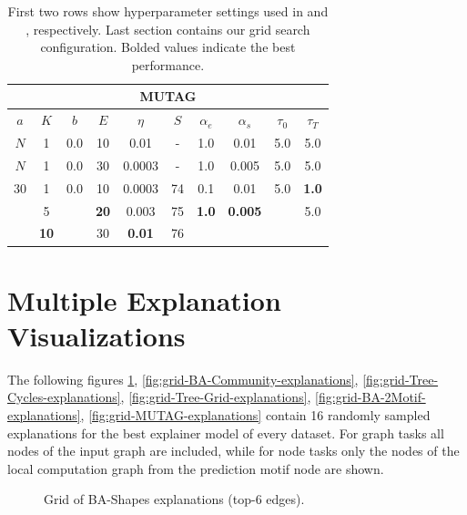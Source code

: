 \begin{table}[h]
  \centering
  \small
  \begin{tabular}{|c|c|c|c|c|c|c|c|c|c|}
  \hline
  \multicolumn{10}{|c|}{\textbf{MUTAG}} \\ \hline
  $a$ & $K$ & $b$ & $E$ & $\eta$ & $S$ & $\alpha_e$ & $\alpha_s$ & $\tau_0$ & $\tau_T$ \\ \hline
  $N$ & 1 & 0.0 & 10 & 0.01 & - & 1.0 & 0.01 & 5.0 & 5.0 \\ \hline
  $N$ & 1 & 0.0 & 30 & 0.0003 & - & 1.0 & 0.005 & 5.0 & 5.0 \\ \hline
  30 & 1 & 0.0 & 10 & 0.0003 & 74 & 0.1 & 0.01 & 5.0 & \textbf{1.0} \\
   & 5 &  & \textbf{20} & 0.003 & 75 & \textbf{1.0} & \textbf{0.005} &  & 5.0 \\
   & \textbf{10} &  & 30 & \textbf{0.01} & 76 &  &  &  &  \\ \hline
  \end{tabular}
  \caption[MUTAG grid search]{First two rows show hyperparameter settings used in \cite{luo2020parameterized} and \cite{holdijk2021re}, respectively. Last section contains our grid search configuration. Bolded values indicate the best performance.}
\end{table}

\clearpage
\section{Multiple Explanation Visualizations}
\label{sec:grid_vis}
The following figures \ref{fig:grid-BA-Shapes-explanations}, \ref{fig:grid-BA-Community-explanations}, \ref{fig:grid-Tree-Cycles-explanations}, \ref{fig:grid-Tree-Grid-explanations}, \ref{fig:grid-BA-2Motif-explanations}, \ref{fig:grid-MUTAG-explanations} contain 16 randomly sampled explanations for the best explainer model of every dataset. For graph tasks all nodes of the input graph are included, while for node tasks only the nodes of the local computation graph from the prediction motif node are shown.

\begin{figure}[htbp]
    \centering
    \caption[Grid of BA-Shapes explanations (top-6 edges)]{Grid of BA-Shapes explanations (top-6 edges).}
    \label{fig:grid-BA-Shapes-explanations}
\end{figure}

